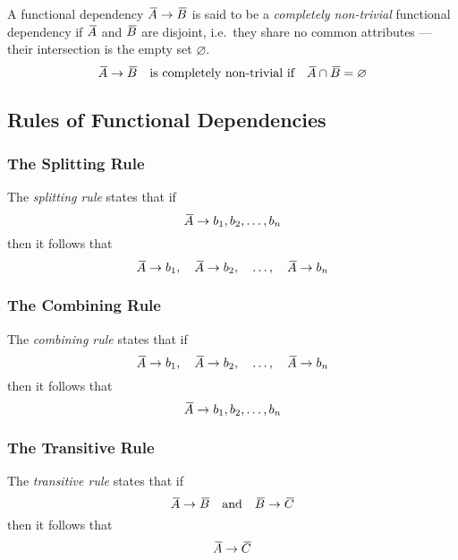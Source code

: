 A functional dependency \( {}\mkern3mu\overline{\mkern-3muA} \rightarrow {}\mkern3mu\overline{\mkern-3muB} \) is said to be a \emph{completely non-trivial} functional dependency if \( {}\mkern3mu\overline{\mkern-3muA} \) and \( {}\mkern3mu\overline{\mkern-3muB} \) are disjoint, i.e.\ they share no common attributes --- their intersection is the empty set \( \varnothing \).
\begin{equation*}
  {}\mkern3mu\overline{\mkern-3muA} \rightarrow {}\mkern3mu\overline{\mkern-3muB} \quad \text{is completely non-trivial if} \quad {}\mkern3mu\overline{\mkern-3muA} \cap {}\mkern3mu\overline{\mkern-3muB} = \varnothing
\end{equation*}

\subsection{Rules of Functional Dependencies}

\subsubsection{The Splitting Rule}

The \emph{splitting rule} states that if
\begin{equation*}
  {}\mkern3mu\overline{\mkern-3muA} \rightarrow b_1, b_2, \ldots, b_n
\end{equation*}
then it follows that
\begin{equation*}
  {}\mkern3mu\overline{\mkern-3muA} \rightarrow b_1, \quad {}\mkern3mu\overline{\mkern-3muA} \rightarrow b_2, \quad \ldots, \quad {}\mkern3mu\overline{\mkern-3muA} \rightarrow b_n
\end{equation*}

\subsubsection{The Combining Rule}

The \emph{combining rule} states that if
\begin{equation*}
  {}\mkern3mu\overline{\mkern-3muA} \rightarrow b_1, \quad {}\mkern3mu\overline{\mkern-3muA} \rightarrow b_2, \quad \ldots, \quad {}\mkern3mu\overline{\mkern-3muA} \rightarrow b_n
\end{equation*}
then it follows that
\begin{equation*}
  {}\mkern3mu\overline{\mkern-3muA} \rightarrow b_1, b_2, \ldots, b_n
\end{equation*}

\subsubsection{The Transitive Rule}

The \emph{transitive rule} states that if
\begin{equation*}
  {}\mkern3mu\overline{\mkern-3muA} \rightarrow {}\mkern3mu\overline{\mkern-3muB} \quad \text{and} \quad {}\mkern3mu\overline{\mkern-3muB} \rightarrow {}\mkern3mu\overline{\mkern-3muC}
\end{equation*}
then it follows that
\begin{equation*}
  {}\mkern3mu\overline{\mkern-3muA} \rightarrow {}\mkern3mu\overline{\mkern-3muC}
\end{equation*}

